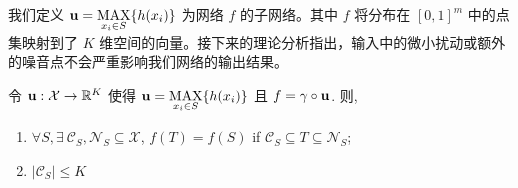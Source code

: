 我们定义 $\mathbf u=\underset{x_i\in S}{\mbox{MAX}}\{h(x_i)\}$ 为网络 $f$ 的子网络。其中 $f$ 将分布在  $[0,1]^m$ 中的点集映射到了 $K$ 维空间的向量。接下来的理论分析指出，输入中的微小扰动或额外的噪音点不会严重影响我们网络的输出结果。


\begin{theorem}

令 $\mathbf u:\mathcal{X}\rightarrow \mathbb{R}^K$ 使得 $\mathbf u=\underset{x_i\in S}{\mbox{MAX}}\{h(x_i)\}$ 且 $f=\gamma \circ \mathbf u$. 则, 


\begin{enumerate}[label=(\alph*)]   

    \item $\forall S, \exists~\mathcal{C}_S, \mathcal{N}_S\subseteq \mathcal{X}$,  $f(T)=f(S)$ if  $\mathcal{C}_S\subseteq T\subseteq \mathcal{N}_S$;
    \item $|\mathcal{C}_S| \le K$
\end{enumerate}
\label{thm:thm2}
\end{theorem}

